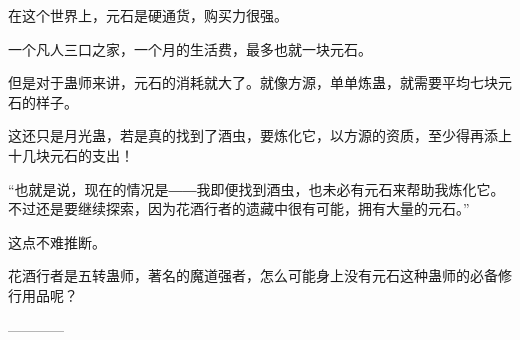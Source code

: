 \begin{this_body}
在这个世界上，元石是硬通货，购买力很强。

一个凡人三口之家，一个月的生活费，最多也就一块元石。

但是对于蛊师来讲，元石的消耗就大了。就像方源，单单炼蛊，就需要平均七块元石的样子。

这还只是月光蛊，若是真的找到了酒虫，要炼化它，以方源的资质，至少得再添上十几块元石的支出！

“也就是说，现在的情况是――我即便找到酒虫，也未必有元石来帮助我炼化它。不过还是要继续探索，因为花酒行者的遗藏中很有可能，拥有大量的元石。”

这点不难推断。

花酒行者是五转蛊师，著名的魔道强者，怎么可能身上没有元石这种蛊师的必备修行用品呢？

------------

\end{this_body}

